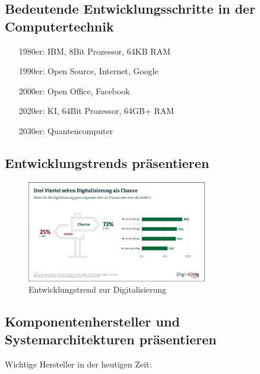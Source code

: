 \subsection{Bedeutende Entwicklungsschritte in der Computertechnik}
    \vspace{0.5em}
    \begin{itemize}[leftmargin=3cm]
        \item[1980er:] IBM, 8Bit Prozessor, 64KB RAM
        \item[1990er:] Open Source, Internet, Google
        \item[2000er:] Open Office, Facebook
        \item[2020er:] KI, 64Bit Prozessor, 64GB+ RAM
        \item[2030er:] Quantencomputer
    \end{itemize}

\newpage
\subsection{Entwicklungstrends präsentieren}
    \vspace{-0.5em}
    \begin{figure}[h]
        \centering
        \includegraphics[width=0.7\textwidth]{./images/2.1.3_entwicklungstrend-digitalisierung.png}
        \caption{Entwicklungstrend zur Digitalisierung}\label{fig:Entwicklungstrend_Digitalisierung}
    \end{figure}
    \vspace{-0.5em}

\subsection{Komponentenhersteller und Systemarchitekturen präsentieren}
    \begin{subindent}
        Wichtige Hersteller in der heutigen Zeit:
    \end{subindent}
    \vspace{-0.5em}
    
